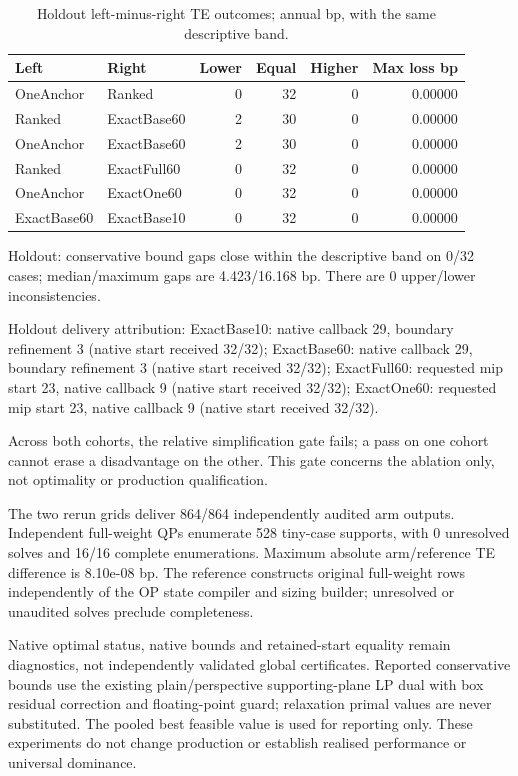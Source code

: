 \begin{table}[htbp]\centering\small

\caption{Holdout left-minus-right TE outcomes; annual bp, with the same descriptive band.}

\begin{tabular}{llrrrr}\toprule

Left & Right & Lower & Equal & Higher & Max loss bp\\\midrule

OneAnchor & Ranked & 0 & 32 & 0 & 0.00000\\

Ranked & ExactBase60 & 2 & 30 & 0 & 0.00000\\

OneAnchor & ExactBase60 & 2 & 30 & 0 & 0.00000\\

Ranked & ExactFull60 & 0 & 32 & 0 & 0.00000\\

OneAnchor & ExactOne60 & 0 & 32 & 0 & 0.00000\\

ExactBase60 & ExactBase10 & 0 & 32 & 0 & 0.00000\\

\bottomrule\end{tabular}\end{table}

Holdout: conservative bound gaps close within the descriptive band on 0/32 cases; median/maximum gaps are 4.423/16.168 bp. There are 0 upper/lower inconsistencies.

Holdout delivery attribution: ExactBase10: native callback 29, boundary refinement 3 (native start received 32/32); ExactBase60: native callback 29, boundary refinement 3 (native start received 32/32); ExactFull60: requested mip start 23, native callback 9 (native start received 32/32); ExactOne60: requested mip start 23, native callback 9 (native start received 32/32).

Across both cohorts, the relative simplification gate fails; a pass on one cohort cannot erase a disadvantage on the other. This gate concerns the ablation only, not optimality or production qualification.

The two rerun grids deliver 864/864 independently audited arm outputs. Independent full-weight QPs enumerate 528 tiny-case supports, with 0 unresolved solves and 16/16 complete enumerations. Maximum absolute arm/reference TE difference is 8.10e-08 bp. The reference constructs original full-weight rows independently of the OP state compiler and sizing builder; unresolved or unaudited solves preclude completeness.

Native optimal status, native bounds and retained-start equality remain diagnostics, not independently validated global certificates. Reported conservative bounds use the existing plain/perspective supporting-plane LP dual with box residual correction and floating-point guard; relaxation primal values are never substituted. The pooled best feasible value is used for reporting only. These experiments do not change production or establish realised performance or universal dominance.
